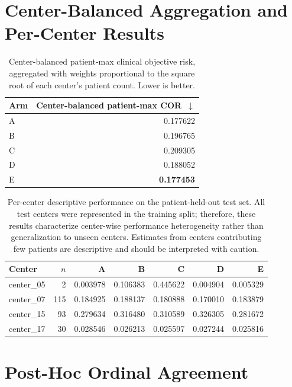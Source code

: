 \documentclass[journal]{IEEEtran}
\begin{document}
\section{Center-Balanced Aggregation and Per-Center Results}

\begin{table}[!t]
\centering
\caption{Center-balanced patient-max clinical objective risk, aggregated with
weights proportional to the square root of each center's patient count. Lower is
better.}
\label{tab:cb}
\small
\begin{tabular}{@{}l r@{}}
\toprule
Arm & Center-balanced patient-max COR~$\downarrow$ \\
\midrule
A & 0.177622 \\
B & 0.196765 \\
C & 0.209305 \\
D & 0.188052 \\
E & \textbf{0.177453} \\
\bottomrule
\end{tabular}
\end{table}

\begin{table}[!t]
\centering
\caption{Per-center descriptive performance on the patient-held-out test set.
All test centers were represented in the training split; therefore, these
results characterize center-wise performance heterogeneity rather than
generalization to unseen centers. Estimates from centers contributing few
patients are descriptive and should be interpreted with caution.}
\label{tab:percenter}
\footnotesize
\setlength{\tabcolsep}{3.5pt}
\begin{tabular}{@{}l r rrrrr@{}}
\toprule
Center & $n$ & A & B & C & D & E \\
\midrule
center\_05 &   2 & 0.003978 & 0.106383 & 0.445622 & 0.004904 & 0.005329 \\
center\_07 & 115 & 0.184925 & 0.188137 & 0.180888 & 0.170010 & 0.183879 \\
center\_15 &  93 & 0.279634 & 0.316480 & 0.310589 & 0.326305 & 0.281672 \\
center\_17 &  30 & 0.028546 & 0.026213 & 0.025597 & 0.027244 & 0.025816 \\
\bottomrule
\end{tabular}
\end{table}

\section{Post-Hoc Ordinal Agreement}
\end{document}
